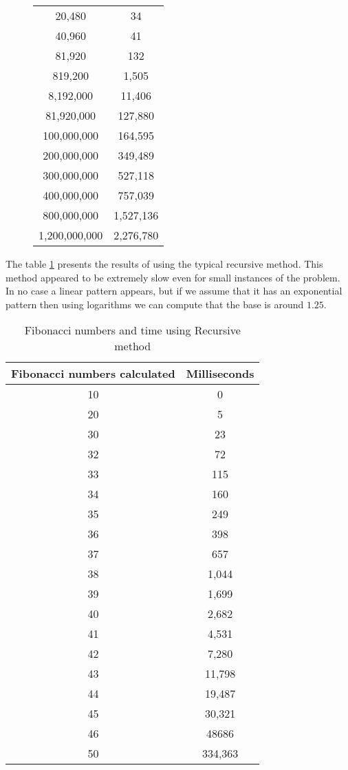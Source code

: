 \documentclass[12pt]{scrartcl}
\begin{document}
\begin{enumerate}
\begin{figure}[h!]
{\begin{tabular}{|c|c|}
20,480 & 34 \\
40,960 & 41 \\
81,920 & 132 \\
 819,200 &1,505\\ 
8,192,000 & 11,406 \\
81,920,000 & 127,880 \\
100,000,000 & 164,595 \\
200,000,000 & 349,489 \\
300,000,000& 527,118 \\
400,000,000 & 757,039 \\
   800,000,000 & 1,527,136 \\
1,200,000,000 & 2,276,780 \\
\hline
	\end{tabular}

	}
\end{figure}

The table \ref{recursive} presents the results of using the typical recursive method. This method appeared to be extremely slow even for small instances of the problem. In no case a linear pattern appears, but if we assume that it has an exponential pattern then using logarithms we can compute that the base is around $1.25$.

\begin{table}[h!]
\centering
\caption{Fibonacci numbers and time using Recursive method}
\label{recursive}
	\begin{tabular}{|c|c|}
	\hline
	Fibonacci numbers calculated	&	Milliseconds	\\
	\hline
	10 & 0 			\\
	20 & 5 			\\
	30 & 23	 	\\
	 32 & 72 		\\
	 33 & 115 	\\
	34 & 160 	\\
	35 & 249 	\\
 	36 & 398 	\\
	37 & 657 	\\
	38 & 1,044 \\
	39 & 1,699 	\\
	40 & 2,682 \\
	41 & 4,531 \\
	42 & 7,280 	\\
	43 & 11,798 \\
	44 & 19,487 \\
	45 & 30,321 	\\
	46  & 48686 \\
	50 & 334,363 \\
	\hline
	\end{tabular}
\end{table}


\end{enumerate}
\end{document}
